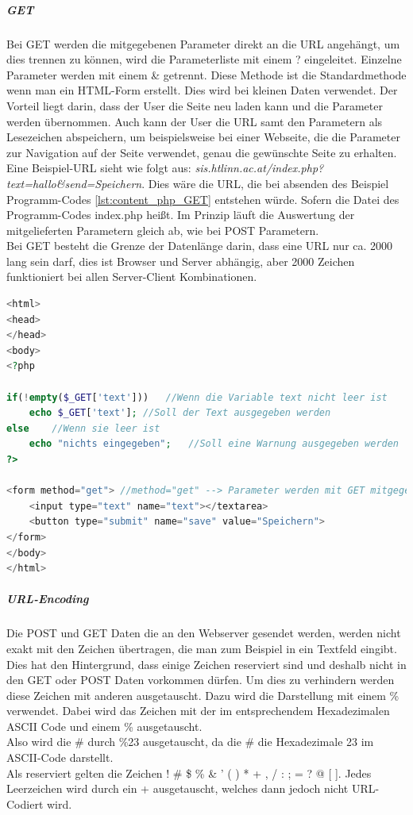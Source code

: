 \subparagraph{GET}
Bei GET werden die mitgegebenen Parameter direkt an die URL angehängt, um dies trennen zu können, wird die Parameterliste mit einem ? eingeleitet. Einzelne Parameter werden mit einem \& getrennt. Diese Methode ist die Standardmethode wenn man ein HTML-Form erstellt. Dies wird bei kleinen Daten verwendet. Der Vorteil liegt darin, dass der User die Seite neu laden kann und die Parameter werden übernommen. Auch kann der User die URL samt den Parametern als Lesezeichen abspeichern, um beispielsweise bei einer Webseite, die die Parameter zur Navigation auf der Seite verwendet, genau die gewünschte Seite zu erhalten. Eine Beispiel-URL sieht wie folgt aus: \textit{sis.htlinn.ac.at/index.php?text=hallo\&send=Speichern}. Dies wäre die URL, die bei absenden des Beispiel Programm-Codes \ref{lst:content_php_GET} entstehen würde. Sofern die Datei des Programm-Codes index.php heißt. Im Prinzip läuft die Auswertung der mitgelieferten Parametern gleich ab, wie bei POST Parametern.\\
Bei GET besteht die Grenze der Datenlänge darin, dass eine URL nur ca. 2000 lang sein darf, dies ist Browser und Server abhängig, aber 2000 Zeichen funktioniert bei allen Server-Client Kombinationen.
\begin{lstlisting}[style=custom, language=PHP,  caption={Beispiel GET},label={lst:content_php_GET}]
<html>
<head>
</head>
<body>
<?php

if(!empty($_GET['text']))	//Wenn die Variable text nicht leer ist
	echo $_GET['text'];	//Soll der Text ausgegeben werden
else	//Wenn sie leer ist
	echo "nichts eingegeben";	//Soll eine Warnung ausgegeben werden
?>

<form method="get">	//method="get" --> Parameter werden mit GET mitgegeben
	<input type="text" name="text"></textarea>
	<button type="submit" name="save" value="Speichern">
</form>
</body>
</html>
\end{lstlisting}
\subparagraph{URL-Encoding}
Die POST und GET Daten die an den Webserver gesendet werden, werden nicht exakt mit den Zeichen übertragen, die man zum Beispiel in ein Textfeld eingibt. Dies hat den Hintergrund, dass einige Zeichen reserviert sind und deshalb nicht in den GET oder POST Daten vorkommen dürfen. Um dies zu verhindern werden diese Zeichen mit anderen ausgetauscht. Dazu wird die Darstellung mit einem \% verwendet. Dabei wird das Zeichen mit der im entsprechendem Hexadezimalen ASCII Code und einem \% ausgetauscht.\\
Also wird die \# durch \%23 ausgetauscht, da die \# die Hexadezimale 23 im ASCII-Code darstellt.\\
Als reserviert gelten die Zeichen ! \# \$ \% \& ' ( ) * + , / : ; = ? @ [ ]. Jedes Leerzeichen wird durch ein + ausgetauscht, welches dann jedoch nicht URL-Codiert wird.
